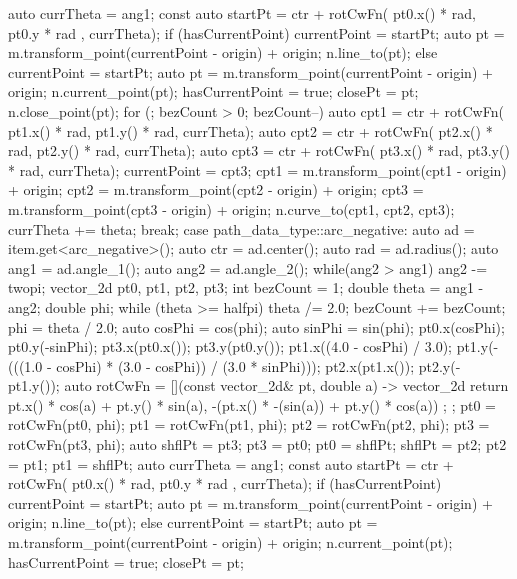 \begin{codeblock}
{{{    auto currTheta = ang1;
    const auto startPt =
      ctr + rotCwFn({ pt0.x() * rad, pt0.y * rad }, currTheta);
    if (hasCurrentPoint) {
      currentPoint = startPt;
      auto pt = m.transform_point(currentPoint - origin) + origin;
      n.line_to(pt);
    }
    else {
      currentPoint = startPt;
      auto pt = m.transform_point(currentPoint - origin) + origin;
      n.current_point(pt);
      hasCurrentPoint = true;
      closePt = pt;
      n.close_point(pt);
    }
    for (; bezCount > 0; bezCount--) {
      auto cpt1 = ctr + rotCwFn({ pt1.x() * rad, pt1.y() * rad, currTheta);
      auto cpt2 = ctr + rotCwFn({ pt2.x() * rad, pt2.y() * rad, currTheta);
      auto cpt3 = ctr + rotCwFn({ pt3.x() * rad, pt3.y() * rad, currTheta);
      currentPoint = cpt3;
      cpt1 = m.transform_point(cpt1 - origin) + origin;
      cpt2 = m.transform_point(cpt2 - origin) + origin;
      cpt3 = m.transform_point(cpt3 - origin) + origin;
      n.curve_to(cpt1, cpt2, cpt3);
      currTheta += theta;
    }
  } break;
  case path_data_type::arc_negative:
  {
    auto ad = item.get<arc_negative>();
    auto ctr = ad.center();
    auto rad = ad.radius();
    auto ang1 = ad.angle_1();
    auto ang2 = ad.angle_2();
    while(ang2 > ang1) {
      ang2 -= twopi;
    }
    vector_2d pt0, pt1, pt2, pt3;
    int bezCount = 1;
    double theta = ang1 - ang2;
    double phi;
    while (theta >= halfpi) {
      theta /= 2.0;
      bezCount += bezCount;
    }
    phi = theta / 2.0;
    auto cosPhi = cos(phi);
    auto sinPhi = sin(phi);
    pt0.x(cosPhi);
    pt0.y(-sinPhi);
    pt3.x(pt0.x());
    pt3.y(pt0.y());
    pt1.x((4.0 - cosPhi) / 3.0);
    pt1.y(-(((1.0 - cosPhi) * (3.0 - cosPhi)) / (3.0 * sinPhi)));
    pt2.x(pt1.x());
    pt2.y(-pt1.y());
    auto rotCwFn = [](const vector_2d& pt, double a) -> vector_2d {
      return { pt.x() * cos(a) + pt.y() * sin(a),
        -(pt.x() * -(sin(a)) + pt.y() * cos(a)) };
    };
    pt0 = rotCwFn(pt0, phi);
    pt1 = rotCwFn(pt1, phi);
    pt2 = rotCwFn(pt2, phi);
    pt3 = rotCwFn(pt3, phi);
    auto shflPt = pt3;
    pt3 = pt0;
    pt0 = shflPt;
    shflPt = pt2;
    pt2 = pt1;
    pt1 = shflPt;
    auto currTheta = ang1;
    const auto startPt =
      ctr + rotCwFn({ pt0.x() * rad, pt0.y * rad }, currTheta);
    if (hasCurrentPoint) {
      currentPoint = startPt;
      auto pt = m.transform_point(currentPoint - origin) + origin;
      n.line_to(pt);
    }
    else {
      currentPoint = startPt;
      auto pt = m.transform_point(currentPoint - origin) + origin;
      n.current_point(pt);
      hasCurrentPoint = true;
      closePt = pt;
}}}}}}}
\end{codeblock}

